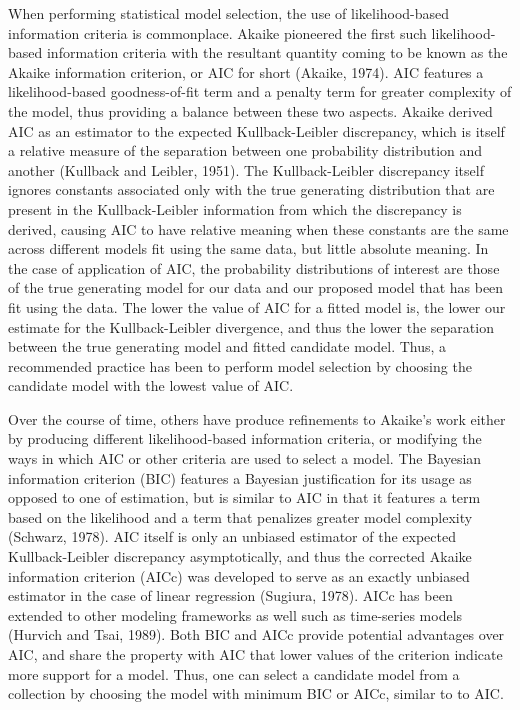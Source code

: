 		When performing statistical model selection, the use of likelihood-based information criteria is commonplace. Akaike pioneered the first such likelihood-based information criteria
		with the resultant quantity coming to be known as the Akaike information criterion, or AIC for short (Akaike, 1974). AIC features a likelihood-based goodness-of-fit term and a
		penalty term for greater complexity of the model, thus providing a balance between these two aspects. Akaike derived AIC as an estimator to the expected Kullback-Leibler discrepancy,
		which is itself a relative measure of the separation between one probability distribution and another (Kullback and Leibler, 1951). The Kullback-Leibler discrepancy itself ignores constants
		associated only with the true generating distribution that are present in the Kullback-Leibler information from which the discrepancy is derived, causing AIC to have relative meaning when these constants
		are the same across different models fit using the same data, but little absolute meaning. In the case of application of AIC, the probability distributions of interest are those of the true generating model
		for our data and our proposed model that has been fit using the data. The lower the value of AIC for a fitted model is, the lower our estimate for the Kullback-Leibler divergence,
		and thus the lower the separation between the true generating model and fitted candidate model. Thus, a recommended practice has been to perform model selection by choosing
		the candidate model with the lowest value of AIC.

		Over the course of time, others have produce refinements to Akaike's work either by producing different likelihood-based information criteria, or modifying the ways in which AIC or other
		criteria are used to select a model. The Bayesian information criterion (BIC) features a Bayesian justification for its usage as opposed to one of estimation, but is similar to AIC in that
		it features a term based on the likelihood and a term that penalizes greater model complexity (Schwarz, 1978). AIC itself is only an unbiased estimator of the expected Kullback-Leibler discrepancy
		asymptotically, and thus the corrected Akaike information criterion (AICc) was developed to serve as an exactly unbiased estimator in the case of linear regression (Sugiura, 1978). AICc has
		been extended to other modeling frameworks as well such as time-series models (Hurvich and Tsai, 1989). Both BIC and AICc provide potential advantages over AIC, and share the property with
		AIC that lower values of the criterion indicate more support for a model. Thus, one can select a candidate model from a collection by choosing the model with minimum BIC or AICc, similar to
		to AIC.

